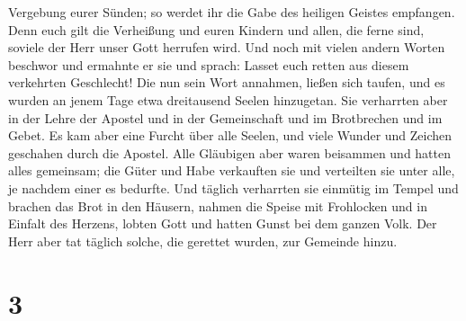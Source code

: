 Vergebung eurer Sünden; so werdet ihr die Gabe des heiligen Geistes
empfangen.  Denn euch gilt die Verheißung und euren
Kindern und allen, die ferne sind, soviele der Herr unser Gott herrufen
wird.  Und noch mit vielen andern Worten beschwor und
ermahnte er sie und sprach: Lasset euch retten aus diesem verkehrten
Geschlecht!  Die nun sein Wort annahmen, ließen sich
taufen, und es wurden an jenem Tage etwa dreitausend Seelen hinzugetan.
 Sie verharrten aber in der Lehre der Apostel und in der
Gemeinschaft und im Brotbrechen und im Gebet.  Es kam
aber eine Furcht über alle Seelen, und viele Wunder und Zeichen
geschahen durch die Apostel.  Alle Gläubigen aber waren
beisammen und hatten alles gemeinsam;  die Güter und Habe
verkauften sie und verteilten sie unter alle, je nachdem einer es
bedurfte.  Und täglich verharrten sie einmütig im Tempel
und brachen das Brot in den Häusern, nahmen die Speise mit Frohlocken
und in Einfalt des Herzens,  lobten Gott und hatten Gunst
bei dem ganzen Volk. Der Herr aber tat täglich solche, die gerettet
wurden, zur Gemeinde hinzu.

\hypertarget{section-2}{%
\section{3}\label{section-2}}

